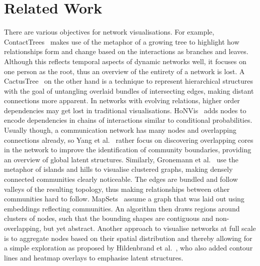 \section{Related Work}
There are various objectives for network visualisations.
For example, ContactTrees~\cite{sallaberry2016contact} makes use of the metaphor of a growing tree to highlight how relationships form and change based on the interactions as branches and leaves.
Although this reflects temporal aspects of dynamic networks well, it focuses on one person as the root, thus an overview of the entirety of a network is lost.
A CactusTree~\cite{dang2017cactustree} on the other hand is a technique to represent hierarchical structures with the goal of untangling overlaid bundles of intersecting edges, making distant connections more apparent.
In networks with evolving relations, higher order dependencies may get lost in traditional visualisations.
HoNVis~\cite{tao2017honvis} adds nodes to encode dependencies in chains of interactions similar to conditional probabilities.
Usually though, a communication network has many nodes and overlapping connections already, so Yang et al.~\cite{yang2014overlapping} rather focus on discovering overlapping cores in the network to improve the identification of community boundaries, providing an overview of global latent structures.
Similarly, Gronemann et al.~\cite{gronemann2012drawing} use the metaphor of islands and hills to visualise clustered graphs, making densely connected communities clearly noticeable.
The edges are bundled and follow valleys of the resulting topology, thus making relationships between other communities hard to follow.
MapSets~\cite{efrat2015mapsets} assume a graph that was laid out using embeddings reflecting communities.
An algorithm then draws regions around clusters of nodes, such that the bounding shapes are contiguous and non-overlapping, but yet abstract.
Another approach to visualise networks at full scale is to aggregate nodes based on their spatial distribution and thereby allowing for a simple exploration as proposed by Hildenbrand et al.~\cite{hildenbrand2016flexible}, who also added contour lines and heatmap overlays to emphasise latent structures.

